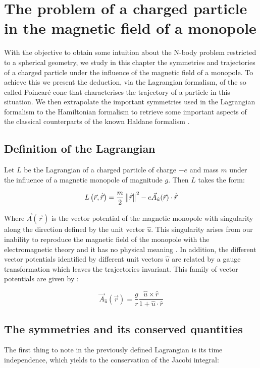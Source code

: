 \chapter{The problem of a charged particle in the magnetic field of a monopole}

With the objective to obtain some intuition about the N-body problem restricted to a spherical geometry, we study in this chapter the symmetries and trajectories of a charged particle under the influence of the magnetic field of a monopole. To achieve this we present the deduction, via the Lagrangian formalism, of the so called Poincar\'e cone \cite{poincare} that characterises the trajectory of a particle in this situation. We then extrapolate the important symmetries used in the Lagrangian formalism to the Hamiltonian formalism to retrieve some important aspects of the classical counterparts of the known Haldane formalism \cite{haldane}.\\

\section{Definition of the Lagrangian}
Let $L$ be the Lagrangian of a charged particle of charge $-e$ and mass $m$ under the influence of a magnetic monopole of magnitude $g$. Then $L$ takes the form:

\begin{equation}
L\left( \vec{r},\dot{\vec{r}} \right) = \frac{m}{2}\left\lVert \dot{\vec{r}} \right\rVert^2 - e\vec{A}_{\hat{u}}(\vec{r})\cdot\dot{\vec{r}}
\label{eq:lagrangian}
\end{equation}

Where $\vec{A}(\vec{r})$ is the vector potential of the magnetic monopole with singularity along the direction defined by the unit vector $\hat{u}$. This singularity arises from our inability to reproduce the magnetic field of the monopole with the electromagnetic theory and it has no physical meaning \cite{haldane}. In addition, the different vector potentials identified by different unit vectors $\hat{u}$ are related by a gauge transformation which leaves the trajectories invariant. This family of vector potentials are given by \cite{vectorPotentials}:

\begin{equation}
\vec{A}_{\hat{u}}(\vec{r}) = \frac{g}{r}\frac{\hat{u}\times\hat{r}}{1+\hat{u}\cdot\hat{r}}
\label{eq:monopolepotential}
\end{equation}

\section{The symmetries and its conserved quantities}
The first thing to note in the previously defined Lagrangian is its time independence, which yields to the conservation of the Jacobi integral:

